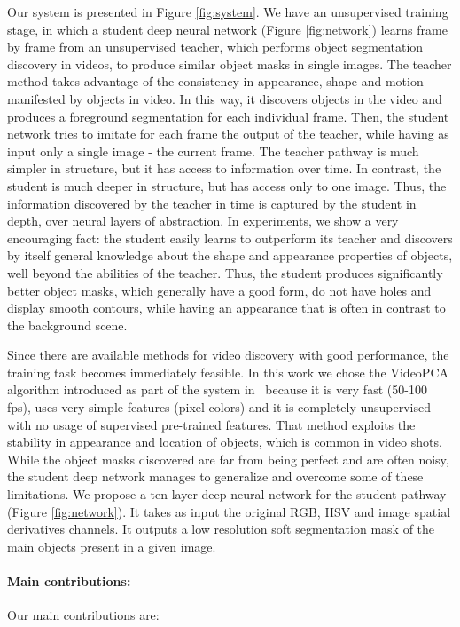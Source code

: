 \documentclass[10pt,twocolumn,letterpaper]{article}
\begin{document}
   Our system is presented in Figure \ref{fig:system}.
   We have an unsupervised training stage, in which a student deep neural network (Figure \ref{fig:network}) learns frame by frame from an unsupervised teacher, which performs object segmentation discovery in videos, to produce similar object masks in single images. The teacher method takes advantage of the consistency in appearance, shape and motion manifested by objects in video. In this way, it discovers objects in the video and produces a foreground segmentation for each individual frame. Then, the student network tries to imitate for each frame the output of the teacher, while having as input only a single image - the current frame. The teacher pathway is much simpler in structure, but it has access to information over time. In contrast, the student is much deeper in structure, but has access only to one image. Thus, the information discovered by the teacher in time is captured by the student in depth, over neural layers of abstraction. In experiments, we show a very encouraging fact: the student easily learns to outperform its teacher and discovers by itself general knowledge about the shape and appearance properties of objects, well beyond the abilities of the teacher. Thus, the student produces significantly better object masks, which generally have a good form, do not have holes and display smooth contours, while having an appearance that is often in contrast to the background scene. 
   
  Since there are available methods for video discovery with good performance, the training task becomes immediately feasible. In this work we chose the VideoPCA algorithm introduced as part of the system in~\cite{stretcu2015multiple} because it is very fast (50-100 fps), uses very simple features (pixel colors) and it is completely unsupervised - with no usage of supervised pre-trained features. That method exploits the stability in appearance and location of objects, which is common in video shots.  
  While the object masks discovered are far from being perfect and are often noisy, the student deep network manages to generalize and overcome some of these limitations. We propose a ten layer deep neural network for the student pathway (Figure \ref{fig:network}). It takes as input the original RGB, HSV and image spatial derivatives channels. It outputs a low resolution soft segmentation mask of the main objects present in a given image.

\paragraph{Main contributions:}
Our main contributions are: 
\end{document}
